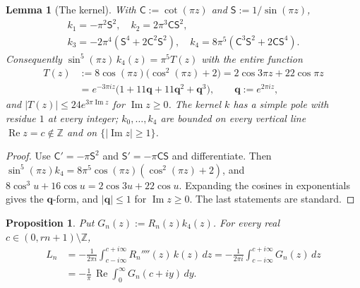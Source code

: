 \documentclass[11pt]{amsart}
\newtheorem{proposition}[theorem]{Proposition}
\newtheorem{lemma}[theorem]{Lemma}
\theoremstyle{definition}
\theoremstyle{remark}
\numberwithin{equation}{section}
\newcommand{\ZZ}{\mathbb{Z}}
\renewcommand{\Re}{\operatorname{Re}}
\renewcommand{\Im}{\operatorname{Im}}
\begin{document}
\begin{lemma}[The kernel]\label{lem:trig}
With $\mathsf C:=\cot(\pi z)$ and $\mathsf S:=1/\sin(\pi z)$,
\begin{gather*}
  k_1=-\pi^2\mathsf S^2,\quad k_2=2\pi^3\mathsf C\mathsf S^2,\\
  k_3=-2\pi^4(\mathsf S^4+2\mathsf C^2\mathsf S^2),\quad k_4=8\pi^5(\mathsf C^3\mathsf S^2+2\mathsf C\mathsf S^4).
\end{gather*}
Consequently $\sin^5(\pi z)\,k_4(z)=\pi^5T(z)$ with the entire function
\begin{align*}
  T(z)&:=8\cos(\pi z)\bigl(\cos^2(\pi z)+2\bigr)=2\cos3\pi z+22\cos\pi z\\
  &=e^{-3\pi iz}\bigl(1+11\mathbf q+11\mathbf q^2+\mathbf q^3\bigr),\qquad \mathbf q:=e^{2\pi iz},
\end{align*}
and $|T(z)|\le24e^{3\pi\Im z}$ for $\Im z\ge0$. The kernel $k$ has a simple pole with residue $1$ at every
integer; $k_0,\dots,k_4$ are bounded on every vertical line $\Re z=c\notin\ZZ$ and on $\{|\Im z|\ge1\}$.
\end{lemma}

\begin{proof}
Use $\mathsf C'=-\pi\mathsf S^2$ and $\mathsf S'=-\pi\mathsf C\mathsf S$ and differentiate. Then
$\sin^5(\pi z)k_4=8\pi^5\cos(\pi z)(\cos^2(\pi z)+2)$, and $8\cos^3u+16\cos u=2\cos3u+22\cos u$. Expanding the
cosines in exponentials gives the $\mathbf q$-form, and $|\mathbf q|\le1$ for $\Im z\ge0$. The last statements
are standard.
\end{proof}

\begin{proposition}\label{prop:contour}
Put $G_n(z):=R_n(z)k_4(z)$. For every real $c\in(0,rn+1)\setminus\ZZ$,
\begin{align*}
  L_n&=-\frac1{2\pi i}\int_{c-i\infty}^{c+i\infty}R_n''''(z)\,k(z)\,dz
     =-\frac1{2\pi i}\int_{c-i\infty}^{c+i\infty}G_n(z)\,dz\\
     &=-\frac1\pi\,\Re\int_0^\infty G_n(c+iy)\,dy .
\end{align*}
\end{proposition}
\end{document}
